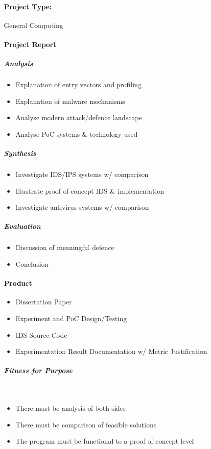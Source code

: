 \paragraph{Project Type:} General Computing

\paragraph{Project Report}
\subparagraph{Analysis}
\begin{itemize}
	\item Explanation of entry vectors and profiling
	\item Explanation of malware mechanisms
	\item Analyse modern attack/defence landscape
	\item Analyse PoC systems \& technology used 
\end{itemize}

\subparagraph{Synthesis}
\begin{itemize}
	\item Investigate IDS/IPS systems w/ comparison
	\item Illustrate proof of concept IDS \& implementation
	\item Investigate antivirus systems w/ comparison
\end{itemize}

\subparagraph{Evaluation}
\begin{itemize}
	\item Discussion of meaningful defence
	\item Conclusion
\end{itemize}

\paragraph{Product}
\begin{itemize}
	\item Dissertation Paper
	\item Experiment and PoC Design/Testing
	\item IDS Source Code
	\item Experimentation Result Documentation w/ Metric Justification
\end{itemize}

\subparagraph{Fitness for Purpose}~
\begin{itemize}
	\item There must be analysis of both sides
	\item There must be comparison of feasible solutions
	\item The program must be functional to a proof of concept level
\end{itemize}

